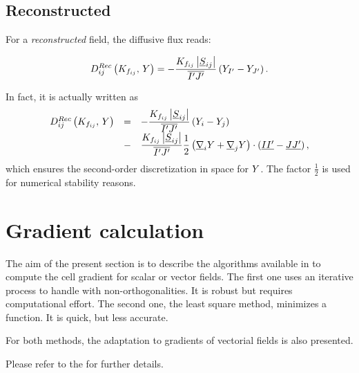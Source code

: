 \subsection{Reconstructed}
For a \emph{reconstructed} field, the diffusive flux reads:

\begin{equation}
D_{ij}^{Rec} \left( K_{f_{ij}} , \, Y \right)  =  - \dfrac{K_{f_{ij}} \left| \underline{S}_{ij} \right|}{\overline{{I^\prime} {J^\prime}} } \left( Y_{I^\prime} - Y_{J^\prime} \right).
\end{equation}

\begin{remark}
In fact, it is actually written as
%
\begin{equation}
\begin{array}{r c l}
D_{ij}^{Rec} \left( K_{f_{ij}} , \, Y \right)  &=&  - \dfrac{K_{f_{ij}} \left| \underline{S}_{ij} \right|}{\overline{{I^\prime} {J^\prime}} } \left( Y_i - Y_j \right) \\
&-& \dfrac{K_{f_{ij}} \left| \underline{S}_{ij} \right|}{\overline{{I^\prime} {J^\prime}} }  \dfrac{1}{2}\left( \underline{\nabla}_i Y + \underline{\nabla}_j Y \right) \cdot \left( \underline{I {I^\prime}} - \underline{J {J^\prime}} \right),
\end{array}
\end{equation}
%
which ensures the second-order discretization in space for $Y$.
The factor $ \frac{1}{2}$ is used for numerical stability reasons.
\end{remark}


\section{Gradient calculation}

\hypertarget{gradreco}{}

The aim of the present section is to describe the algorithms available in \CS
to compute the cell gradient for scalar or vector fields. The first one uses an
iterative process to handle with non-orthogonalities. It is robust but requires
computational effort. The second one, the least square method, minimizes a
function. It is quick, but less accurate.

For both methods, the adaptation to gradients of vectorial fields is also presented.

Please refer to the  for further details.

